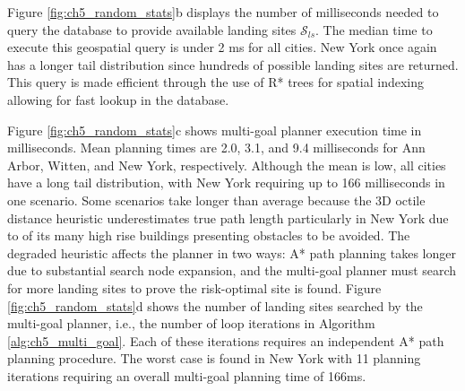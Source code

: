 Figure \ref{fig:ch5_random_stats}b displays the number of milliseconds needed to query the database to provide available landing sites $\mathcal{S}_{ls}$. The median time to execute this geospatial query is under 2 ms for all cities. New York once again has a longer tail distribution since hundreds of possible landing sites are returned. This query is made efficient through the use of R* trees for spatial indexing allowing for fast lookup in the database.

Figure \ref{fig:ch5_random_stats}c shows multi-goal planner execution time in milliseconds.  Mean planning times are 2.0, 3.1, and 9.4 milliseconds for Ann Arbor, Witten, and New York, respectively. Although the mean is low, all cities have a long tail distribution, with New York requiring up to 166 milliseconds in one scenario. Some scenarios take longer than average because the 3D octile distance heuristic underestimates true path length particularly in New York due to of its many high rise buildings presenting obstacles to be avoided. The degraded heuristic affects the planner in two ways: A* path planning takes longer due to substantial search node expansion, and the multi-goal planner must search for more landing sites to prove the risk-optimal site is found. Figure \ref{fig:ch5_random_stats}d shows the number of landing sites searched by the multi-goal planner, i.e., the number of loop iterations in Algorithm \ref{alg:ch5_multi_goal}. Each of these iterations requires an independent A* path planning procedure. The worst case is found in New York with 11 planning iterations requiring an overall multi-goal planning time of 166ms.  



